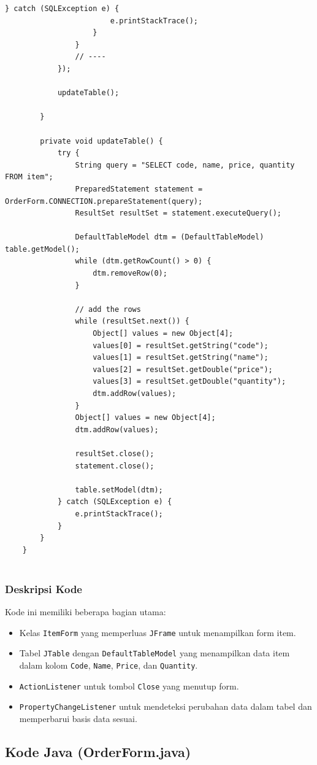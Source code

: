 \begin{lstlisting}[style=JavaStyle]
					} catch (SQLException e) {
						e.printStackTrace();
					}
				}
				// ----
			});
			
			updateTable();
			
		}
		
		private void updateTable() {
			try {
				String query = "SELECT code, name, price, quantity FROM item";
				PreparedStatement statement = OrderForm.CONNECTION.prepareStatement(query);
				ResultSet resultSet = statement.executeQuery();
				
				DefaultTableModel dtm = (DefaultTableModel) table.getModel();
				while (dtm.getRowCount() > 0) {
					dtm.removeRow(0);
				}
				
				// add the rows
				while (resultSet.next()) {
					Object[] values = new Object[4];
					values[0] = resultSet.getString("code");
					values[1] = resultSet.getString("name");
					values[2] = resultSet.getDouble("price");
					values[3] = resultSet.getDouble("quantity");
					dtm.addRow(values);
				}
				Object[] values = new Object[4];
				dtm.addRow(values);
				
				resultSet.close();
				statement.close();
				
				table.setModel(dtm);
			} catch (SQLException e) {
				e.printStackTrace();
			}
		}
	}
	
\end{lstlisting}

\subsubsection{Deskripsi Kode}
Kode ini memiliki beberapa bagian utama:
\begin{itemize}
	\item Kelas \texttt{ItemForm} yang memperluas \texttt{JFrame} untuk menampilkan form item.
	\item Tabel \texttt{JTable} dengan \texttt{DefaultTableModel} yang menampilkan data item dalam kolom \texttt{Code}, \texttt{Name}, \texttt{Price}, dan \texttt{Quantity}.
	\item \texttt{ActionListener} untuk tombol \texttt{Close} yang menutup form.
	\item \texttt{PropertyChangeListener} untuk mendeteksi perubahan data dalam tabel dan memperbarui basis data sesuai.
\end{itemize}

\subsection{Kode Java (OrderForm.java)}
	
